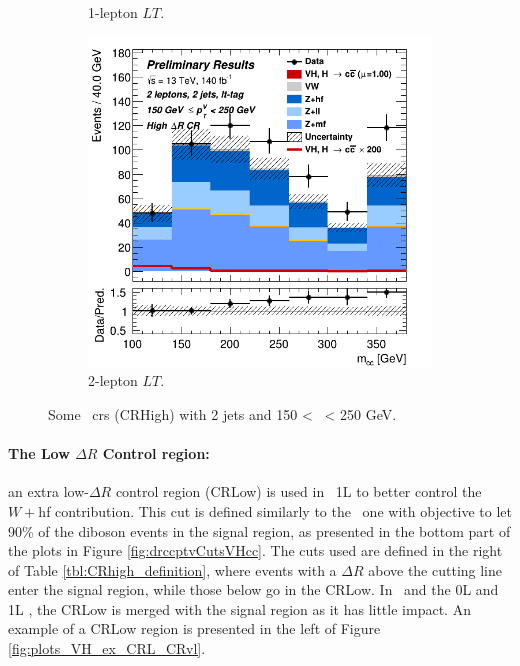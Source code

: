 \begin{figure}[h!]
\begin{subfigure}[b]{0.32\textwidth}
      \caption{1-lepton $LT$.}
      \label{fig:plots_VHcc_ex_1L_CRH}
  \end{subfigure}
  \begin{subfigure}[b]{0.32\textwidth}
    \centering
    \includegraphics[width=\textwidth]{Images/VH/Own_fit/prefit_VHcc/Region_distmBB_BMax250_BMin150_DCRHigh_J2_TTypelt_T2_L2_Y6051_Prefit.png}
    \caption{2-lepton $LT$.}
    \label{fig:plots_VHcc_ex_2L_CRH}
\end{subfigure}
  \caption{Some \highdr\ \gls{cr}s (CRHigh) with 2 jets and 150 < \ptv\ < 250 GeV.}
  \label{fig:plots_VHcc_ex_CRH}
\end{figure} 

\paragraph{The Low $\Delta R$ Control region:} an extra low-$\Delta R$ control region (CRLow) is used in \vhb\ 1L to better control the $W+$hf contribution. This cut is defined similarly to the \highdr\ one with objective to let 90\% of the diboson events in the signal region, as presented in the bottom part of the plots in Figure \ref{fig:drccptvCutsVHcc}. The cuts used are defined in the right of Table \ref{tbl:CRhigh_definition}, where events with a $\Delta R$ above the cutting line enter the signal region, while those below go in the CRLow. In \vhc\ and the 0L and 1L \vhb, the CRLow is merged with the signal region as it has little impact. An example of a CRLow region is presented in the left of Figure \ref{fig:plots_VH_ex_CRL_CRvl}.


